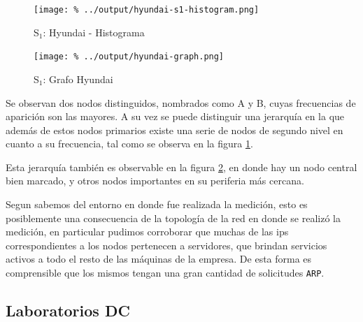 \documentclass[final,inline,a4paper,narroweqnarray]{ieee}
\let\Oldsubsection\subsection
\renewcommand{\subsection}{\FloatBarrier\Oldsubsection}
\begin{document}
    \begin{figure}[ht]\begin{center}
      \texttt{[image: \%
      ../output/hyundai-s1-histogram.png]}
      \vspace{-2em}
      \caption{S$_1$: Hyundai - Histograma}
      \label{hyundai-s1-histogram}
    \end{center}\end{figure}

    \begin{figure}[ht]\begin{center}
      \texttt{[image: \%
      ../output/hyundai-graph.png]}
      \caption{S$_1$: Grafo Hyundai}
      \label{hyundai-graph}
    \end{center}\end{figure}
  
    Se observan dos nodos distinguidos, nombrados como A y B, cuyas
    frecuencias de aparición son las mayores. A su vez se puede distinguir una
    jerarquía en la que además de estos nodos primarios existe una serie de
    nodos de segundo nivel en cuanto a su frecuencia, tal como se observa en
    la figura \ref{hyundai-s1-histogram}.

    Esta jerarquía también es observable en la figura \ref{hyundai-graph}, en
    donde hay un nodo central bien marcado, y otros nodos importantes  en su
    periferia más cercana.

    Segun sabemos del entorno en donde fue realizada la medición, esto es
    posiblemente una consecuencia de la topología de la red en donde se
    realizó la medición, en particular pudimos corroborar que muchas de las
    ips correspondientes a los nodos pertenecen a servidores, que brindan
    servicios activos a todo el resto de las máquinas de la empresa. De esta
    forma es comprensible que los mismos tengan una gran cantidad de
    solicitudes \texttt{ARP}.

  \subsection{Laboratorios DC}
\end{document}

